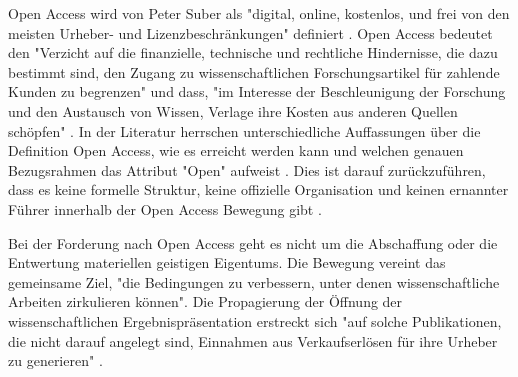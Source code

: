 Open Access wird von Peter Suber als "digital, online, kostenlos, und frei von den meisten Urheber- und Lizenzbeschränkungen" \cite{suber_2012_open} definiert \cite{Adema_2014_open_access}. Open Access bedeutet den "Verzicht auf die finanzielle, technische und rechtliche Hindernisse, die dazu bestimmt sind, den Zugang zu wissenschaftlichen Forschungsartikel für zahlende Kunden zu begrenzen" und dass, "im Interesse der Beschleunigung der Forschung und den Austausch von Wissen, Verlage ihre Kosten aus anderen Quellen schöpfen" \cite{Suber_2002}. In der Literatur herrschen unterschiedliche Auffassungen über die Definition Open Access, wie es erreicht werden kann und welchen genauen Bezugsrahmen das Attribut "Open" aufweist \cite{Adema_2014_open_access}. Dies ist darauf zurückzuführen, dass es keine formelle Struktur, keine offizielle Organisation und keinen ernannter Führer innerhalb der Open Access Bewegung gibt \cite{poynder_2011_suber}.

Bei der Forderung nach Open Access geht es nicht um die Abschaffung oder die Entwertung materiellen geistigen Eigentums. Die Bewegung vereint das gemeinsame Ziel, "die Bedingungen zu verbessern, unter denen wissenschaftliche Arbeiten zirkulieren können"\cite{Adema_2014_open_access}. Die Propagierung der Öffnung der wissenschaftlichen Ergebnispräsentation erstreckt sich "auf solche Publikationen, die nicht darauf angelegt sind, Einnahmen aus Verkaufserlösen für ihre Urheber zu generieren" \cite{muller_2010_open}.


